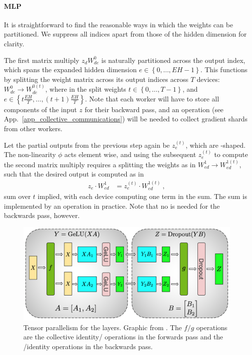 \documentclass[11pt]{article}
\begin{document}
\paragraph{MLP}
It is straightforward to find the reasonable ways in which the weights can be partitioned. We
suppress all indices apart from those of the hidden dimension for clarity.

The first matrix multiply $ z _{ d }W ^{ 0 } _{ d e } $ is naturally partitioned across the output
index, which spans the expanded hidden dimension $ e\in \left \{ 0, \ldots , EH-1 \right \} $. This
functions by splitting the weight matrix across its output indices across $ T $ devices:  $ W ^{ 0 }
_{ d e } \longrightarrow W ^{ 0(t) } _{ d e }$, where in the split weights $ t\in \left \{ 0,
    \ldots , T-1  \right \} $, and $ e \in \left \{ t\frac{  EH}{ T } ,
\ldots ,\left ( t+1 \right ) \frac{ EH }{ T } \right \} $. Note that each worker will have to store
all components of the input $ z $ for their backward pass, and an  operation
(see App.~\ref{app_collective_communications}) will be needed to collect gradient shards from other
workers.


Let the partial outputs from the previous step again be $ z _{ e } ^{ (t) } $, which are
-shaped. The non-linearity $ \phi $ acts element wise, and using the subsequent
$ z _{ e } ^{ (t) }  $ to compute the second matrix multiply requires a splitting the weights as in $ W ^{ 1 }
_{ e d } \longrightarrow W ^{ 1(t) } _{  e d}$, such that the desired output is computed as in
\begin{align}
     z _{ e }\cdot W ^{ 1 }_{ ed }&=z _{ e }^{ (t) }\cdot W ^{ 1(t) }_{ ed } \ ,
\end{align}
sum over $ t $ implied, with each device computing one term in the sum.  The sum is implemented by
an  operation in practice. Note that no  is needed for the
backwards pass, however.



\begin{figure}[ht]
 \centering
 \includegraphics[scale=.33]{figures/mlp_mp_2.png}
 \caption{Tensor parallelism for the  layers. Graphic from
 \cite{shoeybi2020megatronlm}. The $ f/g $ operations are the collective
identity/ operations in the forwards pass and the /identity
operations in the backwards pass.}
 \label{fig_mlp_tensor_parallel}
\end{figure}
\end{document}
